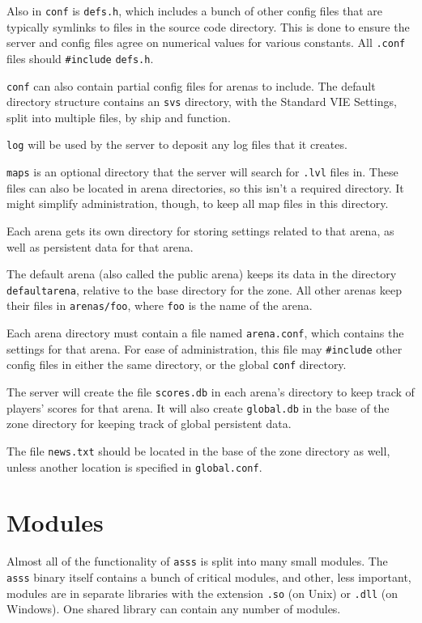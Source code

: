 \documentclass{article}
\newcommand{\asss}{\texttt{asss}}
\begin{document}
Also in \verb/conf/ is \verb/defs.h/, which includes a bunch of other
config files that are typically symlinks to files in the source code
directory. This is done to ensure the server and config files agree on
numerical values for various constants. All \verb/.conf/ files should
\verb/#include/ \verb/defs.h/.

\verb/conf/ can also contain partial config files for arenas to include.
The default directory structure contains an \verb/svs/ directory, with
the Standard VIE Settings, split into multiple files, by ship and
function.

\verb/log/ will be used by the server to deposit any log files that it
creates.

\verb/maps/ is an optional directory that the server will search for
\verb/.lvl/ files in. These files can also be located in arena
directories, so this isn't a required directory. It might simplify
administration, though, to keep all map files in this directory.

Each arena gets its own directory for storing settings related to that
arena, as well as persistent data for that arena.

The default arena (also called the public arena) keeps its data in the
directory \verb/defaultarena/, relative to the base directory for the
zone. All other arenas keep their files in \verb|arenas/foo|, where
\verb/foo/ is the name of the arena.

Each arena directory must contain a file named \verb/arena.conf/, which
contains the settings for that arena. For ease of administration, this
file may \verb/#include/ other config files in either the same
directory, or the global \verb/conf/ directory.

The server will create the file \verb/scores.db/ in each arena's
directory to keep track of players' scores for that arena. It will also
create \verb/global.db/ in the base of the zone directory for keeping
track of global persistent data.

The file \verb/news.txt/ should be located in the base of the zone
directory as well, unless another location is specified in
\verb/global.conf/.

\section{Modules}

Almost all of the functionality of \asss{} is split into many small
modules. The \asss{} binary itself contains a bunch of critical modules,
and other, less important, modules are in separate libraries with the
extension \verb/.so/ (on Unix) or \verb/.dll/ (on Windows). One shared
library can contain any number of modules.
\end{document}
